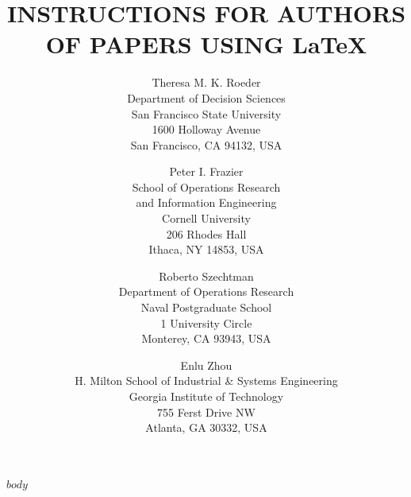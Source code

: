 \documentclass{wscpaperproc}
\begin{document}
%
%

\title{INSTRUCTIONS FOR AUTHORS OF PAPERS USING \LaTeX}

\author{Theresa M. K. Roeder\\ [12pt]
Department of Decision Sciences \\
San Francisco State University\\
1600 Holloway Avenue\\
San Francisco, CA 94132, USA\\
\and
Peter I. Frazier\\[12pt]
School of Operations Research\\ and Information Engineering \\
Cornell University\\
206 Rhodes Hall\\
Ithaca, NY 14853, USA\\
\and
Roberto Szechtman\\ [12pt]
Department of Operations Research\\
Naval Postgraduate School\\
1 University Circle\\
Monterey, CA 93943, USA\\
\and
Enlu Zhou\\ [12pt]
H. Milton School of Industrial \& Systems Engineering\\
Georgia Institute of Technology\\
755 Ferst Drive NW\\
Atlanta, GA 30332, USA
}

\maketitle

$body$
\end{document}
